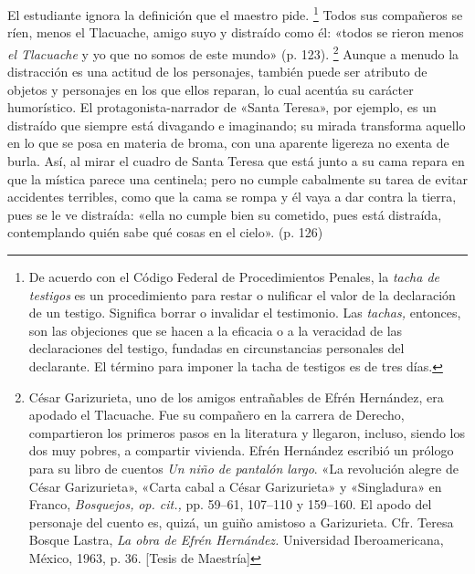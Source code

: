 \documentclass[14pt,twoside,final]{extbook} %
\let\oldfootnote\footnote
\renewcommand\footnote[1]{%
\oldfootnote{\hspace{1mm}#1}}
\begin{document}
El estudiante ignora la definición que el maestro pide.\footnote{De acuerdo con el Código Federal de Procedimientos Penales, la \emph{tacha de testigos} es un procedimiento para restar o nulificar el valor de la declaración de un testigo. Significa borrar o invalidar el testimonio. Las \emph{tachas,} entonces, son las objeciones que se hacen a la eficacia o a la veracidad de las declaraciones del testigo, fundadas en circunstancias personales del declarante. El término para imponer la tacha de testigos es de tres días.} Todos sus compañeros se ríen, menos el Tlacuache, amigo suyo y distraído como él: «todos se rieron menos \emph{el Tlacuache} y yo que no somos de este mundo» (p. 123).\footnote{César Garizurieta, uno de los amigos entrañables de Efrén Hernández, era apodado el Tlacuache. Fue su compañero en la carrera de Derecho, compartieron los primeros pasos en la literatura y llegaron, incluso, siendo los dos muy pobres, a compartir vivienda. Efrén Hernández escribió un prólogo para su libro de cuentos \emph{Un niño de pantalón largo}. «La revolución alegre de César Garizurieta», «Carta cabal a César Garizurieta» y «Singladura» en Franco, \emph{Bosquejos,} \emph{op. cit.,} pp. 59--61, 107--110 y 159--160. El apodo del personaje del cuento es, quizá, un guiño amistoso a Garizurieta.  Cfr. Teresa Bosque Lastra, \emph{La obra de Efrén Hernández.} Universidad Iberoamericana, México, 1963, p. 36. [Tesis de Maestría]} Aunque a menudo la distracción es una actitud de los personajes, también puede ser atributo de objetos y personajes en los que ellos reparan, lo cual acentúa su carácter humorístico. El protagonista-narrador de «Santa Teresa», por ejemplo, es un distraído que siempre está divagando e imaginando; su mirada transforma aquello en lo que se posa en materia de broma, con una aparente ligereza no exenta de burla. Así, al mirar el cuadro de Santa Teresa que está junto a su cama repara en que la mística parece una centinela; pero no cumple cabalmente su tarea de evitar accidentes terribles, como que la cama se rompa y él vaya a dar contra la tierra, pues se le ve distraída: «ella no cumple bien su cometido, pues está distraída, contemplando quién sabe qué cosas en el cielo». (p. 126)
\end{document}

